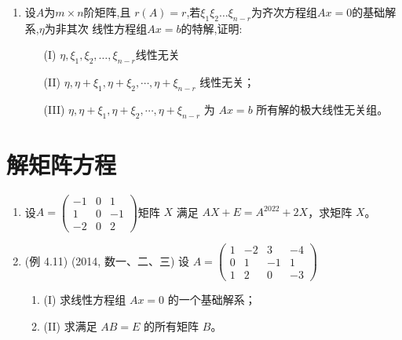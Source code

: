 \documentclass[12pt, a4paper, oneside, UTF8]{ctexbook}
\begin{document}
\begin{enumerate}[label=\arabic*.,start=6]
    \begin{solution}
    \newpage
    \end{solution}
    
    \item 设$A$为$m\times n$阶矩阵,且 $r(A)=r$,若$\xi_1\xi_2\ldots\xi_{n-r}$为齐次方程组$Ax=0$的基础解系,$\eta$为非其次
    线性方程组$Ax=b$的特解,证明:
    \begin{enumerate}
        \item [(I)] $\eta,\xi_1,\xi_2,\ldots,\xi_{n-r}$线性无关
        \item [(II)] $\eta, \eta + \xi_1, \eta + \xi_2, \cdots, \eta + \xi_{n-r}$ 线性无关；
        \item [(III)] $\eta, \eta + \xi_1, \eta + \xi_2, \cdots, \eta + \xi_{n-r}$ 为 $Ax = b$ 所有解的极大线性无关组。
    \end{enumerate}
    
    \begin{solution}
    \newpage
    \end{solution}
\end{enumerate}

\section{解矩阵方程}

\begin{enumerate}[label=\arabic*.,start=10]
    \item 设$A=\begin{pmatrix}
        -1 & 0 & 1\\
        1 & 0 & -1 \\
        -2 & 0 & 2
    \end{pmatrix}$矩阵 $X$ 满足 $AX + E = A^{2022} + 2X$，求矩阵 $X$。
    
    \begin{solution}
    \newpage
    \end{solution}
    
    \item (例 4.11) (2014, 数一、二、三) 设 
    $
    A = \begin{pmatrix}
    1 & -2 & 3 & -4 \\
    0 & 1 & -1 & 1 \\
    1 & 2 & 0 & -3
    \end{pmatrix}
    $
    \begin{enumerate}
        \item (I) 求线性方程组 $Ax = 0$ 的一个基础解系；
        \item (II) 求满足 $AB = E$ 的所有矩阵 $B$。
    \end{enumerate}
    
    \begin{solution}
    \newpage
    \end{solution}
\end{enumerate}
\end{document}
